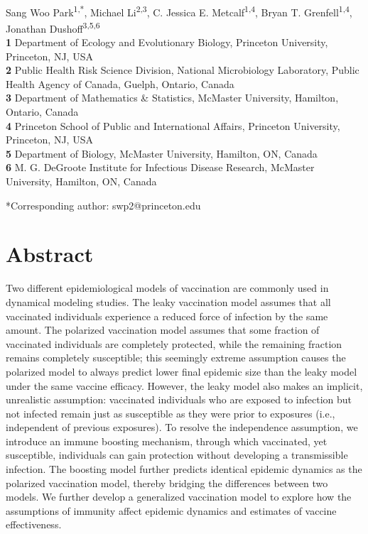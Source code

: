 \documentclass[12pt]{article}
\date{\today}
\begin{document}
\begin{flushleft}{
	\Large
	\textbf{}
}
\newline
\\
Sang Woo Park\textsuperscript{1,*}, Michael Li\textsuperscript{2,3}, C. Jessica E. Metcalf\textsuperscript{1,4}, Bryan T. Grenfell\textsuperscript{1,4}, Jonathan Dushoff\textsuperscript{3,5,6}
\\
\bigskip
\textbf{1} Department of Ecology and Evolutionary Biology, Princeton University, Princeton, NJ, USA\\
\textbf{2} Public Health Risk Science Division, National Microbiology Laboratory, Public Health Agency of Canada, Guelph, Ontario, Canada\\
\textbf{3} Department of Mathematics \& Statistics, McMaster University, Hamilton, Ontario, Canada\\
\textbf{4} Princeton School of Public and International Affairs, Princeton University, Princeton, NJ, USA\\
\textbf{5} Department of Biology, McMaster University, Hamilton, ON, Canada\\
\textbf{6} M. G. DeGroote Institute for Infectious Disease Research, McMaster University, Hamilton, ON, Canada\\
\bigskip

*Corresponding author: swp2@princeton.edu
\end{flushleft}

\section*{Abstract}

Two different epidemiological models of vaccination are commonly used in dynamical modeling studies.
The leaky vaccination model assumes that all vaccinated individuals experience a reduced force of infection by the same amount.
The polarized vaccination model assumes that some fraction of vaccinated individuals are completely protected, while the remaining fraction remains completely susceptible;
this seemingly extreme assumption causes the polarized model to always predict lower final epidemic size than the leaky model under the same vaccine efficacy.
However, the leaky model also makes an implicit, unrealistic assumption: 
vaccinated individuals who are exposed to infection but not infected remain just as susceptible as they were prior to exposures (i.e., independent of previous exposures).
To resolve the independence assumption, we introduce an immune boosting mechanism, through which vaccinated, yet susceptible, individuals can gain protection without developing a transmissible infection.
The boosting model further predicts identical epidemic dynamics as the polarized vaccination model, thereby bridging the differences between two models.
We further develop a generalized vaccination model to explore how the assumptions of immunity affect epidemic dynamics and estimates of vaccine effectiveness.
\end{document}
